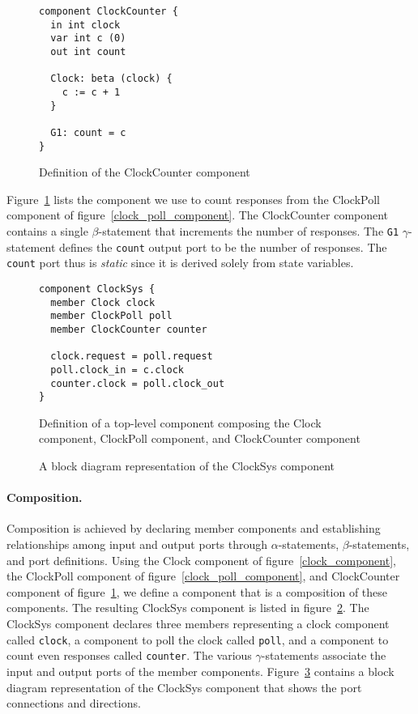 \begin{figure}
\begin{verbatim}
component ClockCounter {
  in int clock
  var int c (0)
  out int count

  Clock: beta (clock) {
    c := c + 1
  }

  G1: count = c
}
\end{verbatim}
\caption{Definition of the ClockCounter component\label{clock_counter_component}}
\end{figure}

Figure~\ref{clock_counter_component} lists the component we use to count responses from the ClockPoll component of figure~\ref{clock_poll_component}.
The ClockCounter component contains a single $\beta$-statement that increments the number of responses.
The \verb+G1+ $\gamma$-statement defines the \verb+count+ output port to be the number of responses.
The \verb+count+ port thus is \emph{static} since it is derived solely from state variables.

\begin{figure}
\begin{verbatim}
component ClockSys {
  member Clock clock
  member ClockPoll poll
  member ClockCounter counter

  clock.request = poll.request
  poll.clock_in = c.clock
  counter.clock = poll.clock_out
}
\end{verbatim}
\caption{Definition of a top-level component composing the Clock component, ClockPoll component, and ClockCounter component\label{clocksys_component}}
\end{figure}

\begin{figure}
{

\centerline{\box\graph}
}
\caption{A block diagram representation of the ClockSys component\label{clocksys_component_graphic}}
\end{figure}

\paragraph{Composition.}
Composition is achieved by declaring member components and establishing relationships among input and output ports through $\alpha$-statements, $\beta$-statements, and port definitions.
Using the Clock component of figure~\ref{clock_component}, the ClockPoll component of figure~\ref{clock_poll_component}, and ClockCounter component of figure~\ref{clock_counter_component}, we define a component that is a composition of these components.
The resulting ClockSys component is listed in figure~\ref{clocksys_component}.
The ClockSys component declares three members representing a clock component called \verb+clock+, a component to poll the clock called \verb+poll+, and a component to count even responses called \verb+counter+.
The various $\gamma$-statements associate the input and output ports of the member components.
Figure~\ref{clocksys_component_graphic} contains a block diagram representation of the ClockSys component that shows the port connections and directions.

